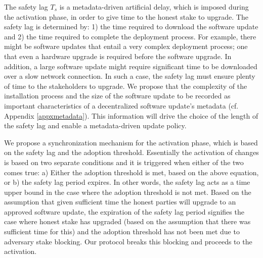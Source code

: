 The safety lag $T_s$ is a metadata-driven artificial delay, which is imposed during the activation phase, in order to give time to the honest stake to upgrade. The safety lag is determined by: 1) the time required to download the software update and 2) the time required to complete the deployment process.
 For example, there might be software updates that entail a very complex deployment process; one that even  a hardware upgrade is required before the software upgrade. In addition, a large software update might require significant time to be downloaded over a slow network connection. In such a case, the safety lag must ensure plenty of time to the stakeholders to upgrade.  
We propose that the complexity of the installation process and the size of the software update to be recorded as important characteristics of a decentralized software update's metadata (cf. Appendix \ref{appxmetadata}). This information will drive the choice of the length of the safety lag and enable a metadata-driven update policy.


We propose a synchronization mechanism for the activation phase, which is based on the safety lag and the adoption threshold. Essentially the activation of changes is based on two separate conditions and it is triggered when either of the two comes true: a) Either the adoption threshold is met, based on the above equation, or b) the safety lag period expires. In other words, the safety lag acts as a time upper bound in the case where the adoption threshold is not met. Based on the assumption that given sufficient time %
the honest parties will upgrade to an approved software update, the expiration of the safety lag period signifies the case where honest stake has upgraded (based on the assumption that there was sufficient time for this) and the adoption threshold has not been met due to adversary stake blocking. Our protocol breaks this blocking and proceeds to the activation. 

